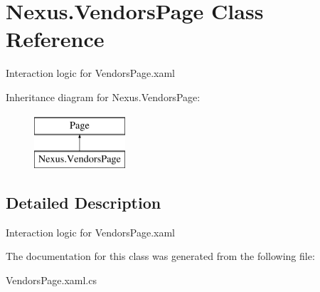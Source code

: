 \hypertarget{class_nexus_1_1_vendors_page}{}\section{Nexus.\+Vendors\+Page Class Reference}
\label{class_nexus_1_1_vendors_page}


Interaction logic for Vendors\+Page.\+xaml  


Inheritance diagram for Nexus.\+Vendors\+Page\+:\begin{figure}[H]
\begin{center}
\leavevmode
\includegraphics[height=2.000000cm]{class_nexus_1_1_vendors_page}
\end{center}
\end{figure}


\subsection{Detailed Description}
Interaction logic for Vendors\+Page.\+xaml 



The documentation for this class was generated from the following file\+:\begin{DoxyCompactItemize}
\item 
Vendors\+Page.\+xaml.\+cs\end{DoxyCompactItemize}
